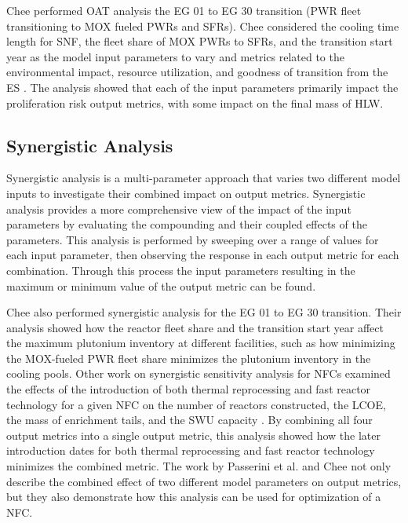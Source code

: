 Chee \cite{chee_sensitivity_2019} performed \gls{OAT} analysis the \gls{EG} 
01 to \gls{EG} 30 transition 
(\gls{PWR} fleet transitioning to \gls{MOX} fueled \glspl{PWR} and \glspl{SFR}). 
Chee considered the cooling time length 
for \gls{SNF}, the fleet share of \gls{MOX} \glspl{PWR} to \glspl{SFR}, and 
the transition start year as the model input parameters to vary and metrics 
related to the environmental impact, resource utilization, and goodness of 
transition from the \gls{ES} \cite{wigeland_nuclear_2014}. The analysis showed 
that each of the input parameters primarily impact the proliferation risk 
output metrics, with some impact on the final mass of \gls{HLW}. 

\subsection{Synergistic Analysis}
Synergistic analysis is a multi-parameter approach that varies two different 
model inputs to investigate their combined impact on output metrics. Synergistic 
analysis provides a more comprehensive view of the impact of the input 
parameters by evaluating the compounding and their coupled effects of the 
parameters.
This analysis is performed by sweeping over a range of values for each input 
parameter, then observing the response in each output metric for each 
combination. Through this process the input parameters resulting in the 
maximum or minimum value of the output metric can be found. 

Chee \cite{chee_sensitivity_2019} also performed synergistic analysis for 
the \gls{EG} 01 to \gls{EG} 30 transition. 
Their analysis showed how the reactor fleet share and the transition start 
year affect the maximum plutonium inventory at different facilities, such as 
how minimizing the \gls{MOX}-fueled \gls{PWR} fleet share minimizes the 
plutonium inventory in the cooling pools. 
Other work on synergistic sensitivity analysis for \glspl{NFC} examined the 
effects of the introduction of both thermal reprocessing and fast reactor 
technology for a given \gls{NFC} on the number of reactors constructed, 
the \gls{LCOE}, the mass of enrichment tails, and the \gls{SWU} 
capacity \cite{passerini_systematic_2014}. By combining all four output 
metrics into a single output metric, this analysis showed how the 
later introduction dates  for both thermal reprocessing 
and fast reactor technology minimizes the combined metric. The work by 
Passerini 
et al. \cite{passerini_systematic_2014} and Chee \cite{chee_sensitivity_2019}
not only describe the combined effect of two different model parameters on 
output metrics, but they also demonstrate how this analysis can be used for 
optimization of a \gls{NFC}. 

